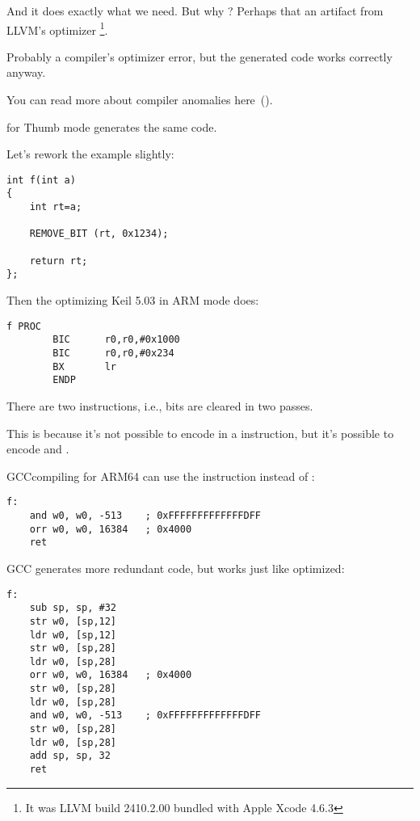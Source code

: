 And it does exactly what we need. 
But why ? 
Perhaps that an artifact from LLVM's optimizer
\footnote{It was LLVM build 2410.2.00 bundled with Apple Xcode 4.6.3}.

Probably a compiler's optimizer error, but the generated code works correctly anyway.

You can read more about compiler anomalies here~().

\OptimizingXcodeIV for Thumb mode generates the same code.


Let's rework the example slightly:

\begin{lstlisting}
int f(int a)
{
    int rt=a;

    REMOVE_BIT (rt, 0x1234);

    return rt;
};
\end{lstlisting}

Then the optimizing Keil 5.03 
in ARM mode does:

\begin{lstlisting}
f PROC
        BIC      r0,r0,#0x1000
        BIC      r0,r0,#0x234
        BX       lr
        ENDP
\end{lstlisting}

There are two  instructions, i.e., bits  are cleared in two passes.

This is because it's not possible to encode  in a  instruction, 
but it's possible to encode  and .


\Optimizing GCCcompiling for ARM64 can use the \AND instruction instead of :

\begin{lstlisting}[caption=\Optimizing GCC (Linaro) 4.9]
f:
	and	w0, w0, -513	; 0xFFFFFFFFFFFFFDFF
	orr	w0, w0, 16384	; 0x4000
	ret
\end{lstlisting}


\NonOptimizing GCC generates more redundant code, but works just like optimized:

\begin{lstlisting}[caption=\NonOptimizing GCC (Linaro) 4.9]
f:
	sub	sp, sp, #32
	str	w0, [sp,12]
	ldr	w0, [sp,12]
	str	w0, [sp,28]
	ldr	w0, [sp,28]
	orr	w0, w0, 16384	; 0x4000
	str	w0, [sp,28]
	ldr	w0, [sp,28]
	and	w0, w0, -513	; 0xFFFFFFFFFFFFFDFF
	str	w0, [sp,28]
	ldr	w0, [sp,28]
	add	sp, sp, 32
	ret
\end{lstlisting}
